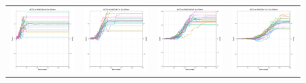 \begin{figure}
\begin{tabular}{cccc}
\hspace{-0.5cm}\includegraphics[width = 1.55in]{images/Visualizations/MCTSvsRANDOM/4000ms5x5.png} &
\hspace{-0.5cm}\includegraphics[width = 1.55in]{images/Visualizations/MCTSvsRANDOM/4000ms7x7.png} &
\hspace{-0.5cm}\includegraphics[width = 1.55in]{images/Visualizations/MCTSvsRANDOM/4000ms9x9.png} &
\hspace{-0.5cm}\includegraphics[width = 1.55in]{images/Visualizations/MCTSvsRANDOM/4000ms11x11.png} \\


\end{tabular}
\end{figure}
